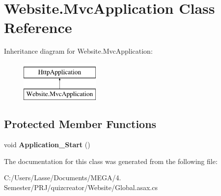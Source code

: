 \hypertarget{class_website_1_1_mvc_application}{}\section{Website.\+Mvc\+Application Class Reference}
\label{class_website_1_1_mvc_application}
Inheritance diagram for Website.\+Mvc\+Application\+:\begin{figure}[H]
\begin{center}
\leavevmode
\includegraphics[height=2.000000cm]{class_website_1_1_mvc_application}
\end{center}
\end{figure}
\subsection*{Protected Member Functions}
\begin{DoxyCompactItemize}
\item 
\hypertarget{class_website_1_1_mvc_application_a6ee3215b20567a5b7903b837110d37dc}{}void {\bfseries Application\+\_\+\+Start} ()\label{class_website_1_1_mvc_application_a6ee3215b20567a5b7903b837110d37dc}

\end{DoxyCompactItemize}


The documentation for this class was generated from the following file\+:\begin{DoxyCompactItemize}
\item 
C\+:/\+Users/\+Lasse/\+Documents/\+M\+E\+G\+A/4. Semester/\+P\+R\+J/quizcreator/\+Website/Global.\+asax.\+cs\end{DoxyCompactItemize}
